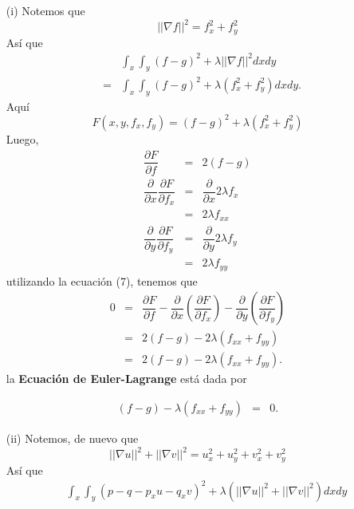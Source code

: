 \documentclass[11pt,letterpaper]{article}
\theoremstyle{definition}
\theoremstyle{definition}
\theoremstyle{definition}
\begin{document}
\begin{itemize}
	\item[(i)] Notemos que
	\begin{equation*}
		|| \nabla f ||^2 = f_x^2 + f_y^2
	\end{equation*}
	Así que
	\begin{eqnarray*}
		&   & \int_x \int_y (f-g)^2 + \lambda || \nabla f ||^2 dx dy \\
		& = & \int_x \int_y (f-g)^2 + \lambda (f_x^2 + f_y^2) dx dy.
	\end{eqnarray*}
	Aquí
	\begin{equation*}
		F(x,y,f_x, f_y) = (f-g)^2 + \lambda (f_x^2 + f_y^2)
	\end{equation*}
	Luego,
	\begin{eqnarray*}
		\dfrac{\partial F}{\partial f} & = &  2(f-g) \\
		\dfrac{\partial}{\partial x} \dfrac{\partial F}{\partial f_x} & = &  \dfrac{\partial}{\partial x} 2 \lambda f_x\\
		& = & 2 \lambda f_{xx} \\
		\dfrac{\partial}{\partial y} \dfrac{\partial F}{\partial f_y} & = &  \dfrac{\partial}{\partial y} 2 \lambda f_y \\
		& = & 2 \lambda f_{yy}
	\end{eqnarray*}
	utilizando la ecuación (7), tenemos que
		\begin{eqnarray*}
		0	& = & \dfrac{\partial F}{\partial f} - \dfrac{\partial}{\partial x} \left( \dfrac{\partial F}{\partial f_x} \right)  - \dfrac{\partial}{\partial y} \left( \dfrac{\partial F}{\partial f_y} \right) \\
			& = & 2(f-g) - 2\lambda (f_{xx} + f_{yy}) \\
			& = & 2(f-g) - 2\lambda (f_{xx} + f_{yy}).
		\end{eqnarray*}
	la \textbf{Ecuación de Euler-Lagrange} está dada por
	\begin{shaded*}
		\begin{eqnarray*}
			(f-g) - \lambda (f_{xx} + f_{yy}) & = & 0.
		\end{eqnarray*}
	\end{shaded*}
	\item[(ii)] Notemos, de nuevo que
	\begin{equation*}
		|| \nabla u ||^2 + || \nabla v ||^2 = u_x^2 + u_y^2 + v_x^2 + v_y^2
	\end{equation*}
	Así que
	\small{\begin{eqnarray*}
		&   & \int_x \int_y (p - q -p_x u - q_x v)^2 + \lambda (|| \nabla u ||^2 + || \nabla v ||^2) dx dy \\

\end{eqnarray*}}
\end{itemize}
\end{document}
